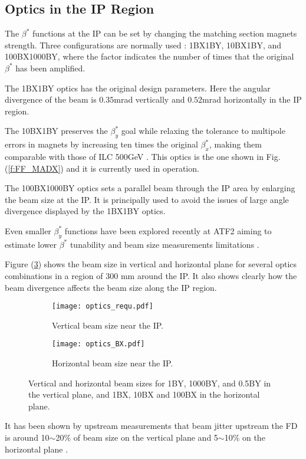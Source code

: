 {{\subsection{Optics in the IP Region}
The $\beta^*$ functions at the IP can be set by changing the matching section magnets strength. Three configurations are normally used : 1BX1BY, 10BX1BY, and 100BX1000BY, where the factor indicates the number of times that the original $\beta^*$ has been amplified.\par
The 1BX1BY optics has the original design parameters. Here the angular divergence of the beam is $0.35$mrad vertically and $0.52$mrad horizontally in the IP region. \par
The 10BX1BY preserves the $\beta_y^*$ goal while relaxing the tolerance to multipole errors in magnets by increasing ten times the original $\beta_x^*$, making them comparable with those of ILC 500GeV \cite{PhysRevSTAB.17.023501}. This optics is the one shown in Fig. (\ref{f:FF_MADX}) and it is currently used in operation.\par
The 100BX1000BY optics sets a parallel beam through the IP area by enlarging the beam size at the IP. It is principally used to avoid the issues of large angle divergence displayed by the 1BX1BY optics.\par
Even smaller $\beta_y^*$ functions have been explored recently at ATF2 aiming to estimate lower $\beta^*$ tunability and beam size measurements limitations \cite{PateckiLowBeta}.\par
Figure (\ref{f:BXYoptics}) shows the beam size in vertical and horizontal plane for several optics combinations in a region of 300 mm around the IP. It also shows clearly how the beam divergence affects the beam size along the IP region.\par 
\begin{figure}[htb]
 \begin{center}
 \hspace*{-1cm}
 \begin{subfigure}[b]{0.45\textwidth}
  \texttt{[image: optics\_requ.pdf]}\caption{Vertical beam size near the IP.}\label{f:opticsBY}
 \end{subfigure}\hspace{0.5cm}
\begin{subfigure}[b]{0.45\textwidth}
  \texttt{[image: optics\_BX.pdf]}\caption{Horizontal beam size near the IP.}\label{f:opticsBX}
 \end{subfigure}
  \caption{Vertical and horizontal beam sizes for 1BY, 1000BY, and 0.5BY in the vertical plane, and 1BX, 10BX and 100BX in the horizontal plane.}\label{f:BXYoptics}
 \end{center}
\end{figure}
It has been shown by upstream measurements that beam jitter upstream the FD is around 10$\sim$20\% of beam size on the vertical plane and 5$\sim$10\% on the horizontal plane \cite{PateckiJitter}.
}}
